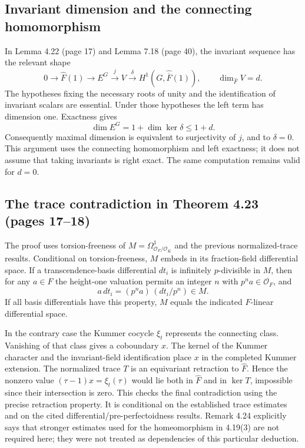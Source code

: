 \documentclass[10pt]{article}
\begin{document}
\subsection*{Invariant dimension and the connecting homomorphism}
In Lemma 4.22 (page 17) and Lemma 7.18 (page 40), the invariant sequence has the relevant shape \[0\longrightarrow \widehat F(1)\longrightarrow E^G
 \xrightarrow{j} V\xrightarrow{\delta} H^1(G,\widehat{\overline F}(1)),
 \qquad \dim_{\widehat F}V=d .\] The hypotheses fixing the necessary roots of unity and the identification of invariant scalars are essential. Under those hypotheses the left term has dimension one. Exactness gives \[\dim E^G=1+\dim\ker\delta\leq 1+d.\] Consequently maximal dimension is equivalent to surjectivity of \(j\), and to \(\delta=0\). This argument uses the connecting homomorphism and left exactness; it does not assume that taking invariants is right exact. The same computation remains valid for \(d=0\).\par
\subsection*{The trace contradiction in Theorem 4.23 (pages 17–18)}
The proof uses torsion-freeness of \(M=\Omega^1_{\mathcal O_F/\mathcal O_{\overline K}}\) and the previous normalized-trace results. Conditional on torsion-freeness, \(M\) embeds in its fraction-field differential space. If a transcendence-basis differential \(dt_i\) is infinitely \(p\)-divisible in \(M\), then for any \(a\in F\) the height-one valuation permits an integer \(n\) with \(p^n a\in\mathcal O_F\), and \[a\,dt_i=(p^na)\,(dt_i/p^n)\in M.\] If all basis differentials have this property, \(M\) equals the indicated \(F\)-linear differential space.\par
In the contrary case the Kummer cocycle \(\xi_t\) represents the connecting class. Vanishing of that class gives a coboundary \(x\). The kernel of the Kummer character and the invariant-field identification place \(x\) in the completed Kummer extension. The normalized trace \(T\) is an equivariant retraction to \(\widehat F\). Hence the nonzero value \((\tau-1)x=\xi_t(\tau)\) would lie both in \(\widehat F\) and in \(\ker T\), impossible since their intersection is zero. This checks the final contradiction using the precise retraction property. It is conditional on the established trace estimates and on the cited differential/pre-perfectoidness results. Remark 4.24 explicitly says that stronger estimates used for the homeomorphism in 4.19(3) are not required here; they were not treated as dependencies of this particular deduction.\par
\end{document}
